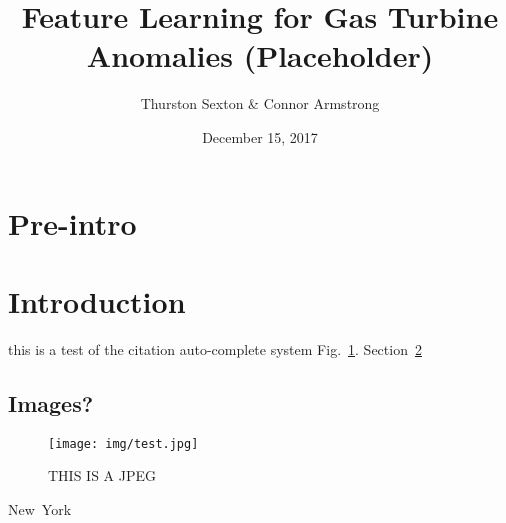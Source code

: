 \documentclass[twocolumn,10pt]{article}
\title{Feature Learning for Gas Turbine Anomalies (Placeholder)}
\author{Thurston Sexton \& Connor Armstrong}
\date{December 15, 2017}
\begin{document}
\maketitle




\section{Pre-intro}
\section{Introduction}\label{sec:intro}
\lipsum[2]\cite{gas_turbine}
this is a test of the citation auto-complete system Fig.~\ref{blah}.
\lipsum[1]\cite{kmean} Section~\ref{sec:intro}
\subsection{Images?}

\begin{figure}
    \centering
    \texttt{[image: img/test.jpg]}
    \caption{THIS IS A JPEG}
    \label{blah}
\end{figure}

New~York






\end{document}
